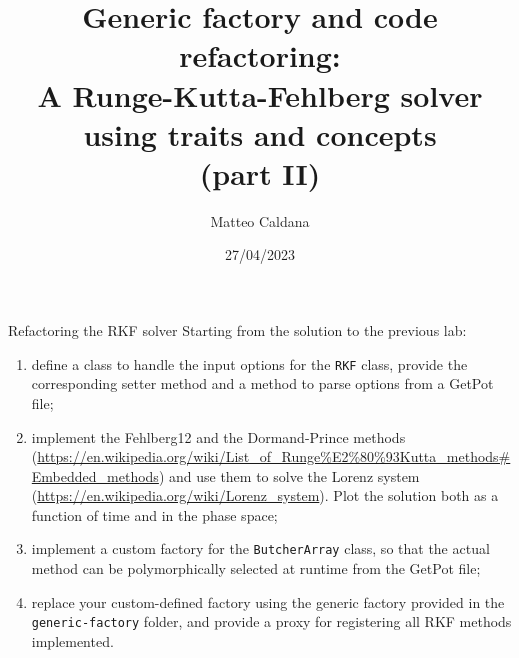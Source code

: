 \documentclass[10pt,aspectratio=169]{beamer}
\begin{document}
\title{Generic factory and code refactoring:\protect\\A Runge-Kutta-Fehlberg solver\protect\\using traits and concepts\protect\\(part II)}
    \author{Matteo Caldana}
    \date{27/04/2023}

\begin{frame}
    \maketitle
\end{frame}

\begin{frame}{Refactoring the RKF solver}
Starting from the solution to the previous lab:
\begin{enumerate}
\item define a class to handle the input options for the \texttt{RKF} class, provide the corresponding setter method and a method to parse options from a GetPot file;
\item implement the Fehlberg12 and the Dormand-Prince methods (\url{https://en.wikipedia.org/wiki/List_of_Runge\%E2\%80\%93Kutta_methods\#Embedded_methods}) and use them to solve the Lorenz system (\url{https://en.wikipedia.org/wiki/Lorenz_system}). Plot the solution both as a function of time and in the phase space;
\item implement a custom factory for the \texttt{ButcherArray} class, so that the actual method can be polymorphically selected at runtime from the GetPot file;
\item replace your custom-defined factory using the generic factory provided in the \texttt{generic-factory} folder, and provide a proxy for registering all RKF methods implemented.
\end{enumerate}
\end{frame}
\end{document}
